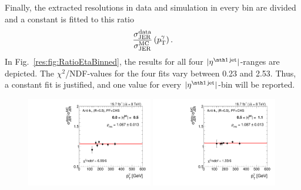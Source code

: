 Finally, the extracted resolutions in data and simulation in every \ptgamma bin are divided and a constant is fitted to this ratio
\begin{equation*}
\frac{\sigma_\mathrm{JER}^{\text{data}}}{\sigma_\mathrm{JER}^{\text{MC}}} \left( p_{\text{T}}^{\gamma} \right).
\end{equation*}
In Fig.~\ref{res:fig:RatioEtaBinned}, the results for all four $|\etafirstjet|$-ranges are depicted. 
The $\chi^2$/NDF-values for the four fits vary between 0.23 and 2.53. 
Thus, a constant fit is justified, and one value for every $|\etafirstjet|$-bin will be reported.

\begin{figure}[!t]
 \centering
    \includegraphics[width=0.49\textwidth]{figures/resolution/results/Ratio_Resolution_for_1_eta_bin_PFCHS_data_comparison_RMS99.pdf}
    \includegraphics[width=0.49\textwidth]{figures/resolution/results/Ratio_Resolution_for_2_eta_bin_PFCHS_data_comparison_RMS99.pdf}
    \vspace{18pt}


\end{figure}
